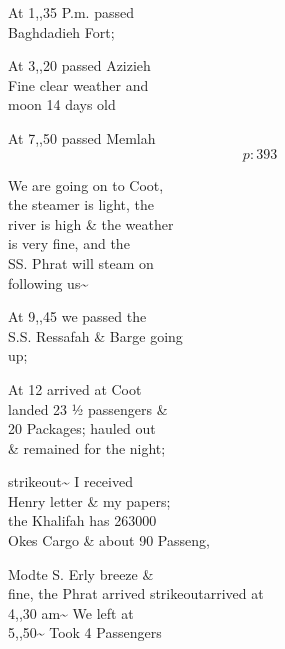 \documentclass{report}
\begin{document}
	\par{
 	At 1,,35 P.m. passed\ \\Baghdadieh Fort;\ \\
	}

	\par{
 	At 3,,20 passed Azizieh\ \\Fine clear weather and\ \\moon 14 days old\ \\
	}

	\par{
 	At 7,,50 passed Memlah\ \\
  \[p: 393 \]

	}



	\par{
 	We are going on to Coot,\ \\the steamer is light, the\ \\river is high \& the weather\ \\is very fine, and the\ \\SS. Phrat will steam on\ \\following us\~{}\ \\
	}

	\par{
 	At 9,,45 we passed the\ \\S.S. Ressafah \& Barge going\ \\up;\ \\
	}

	\par{
 	At 12 arrived at Coot\ \\landed 23 ½ passengers \&\ \\20 Packages; hauled out\ \\\& remained for the night;\ \\
	}

	\par{
 	\lbrack strikeout\rbrack \~{} I received\ \\Henry letter \& my papers;\ \\the Khalifah has 263000\ \\Okes Cargo \& about 90 Passeng,\ \\
	}

	\par{
 	Modte S. Erly breeze \&\ \\fine, the Phrat arrived \lbrack strikeout\rbrack arrived at\ \\4,,30 am\~{} We left at\ \\5,,50\~{} Took 4 Passengers\ \\
	}
\end{document}
